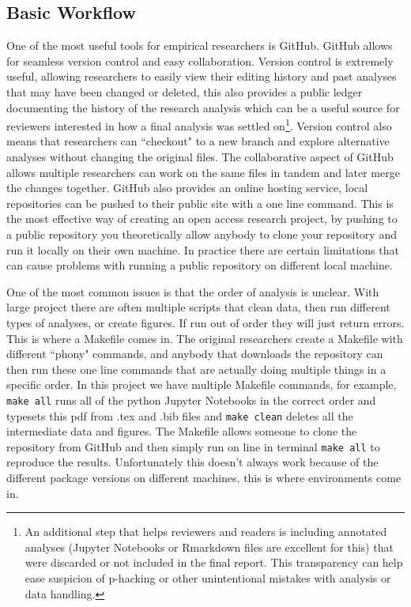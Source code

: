\documentclass[12pt]{article}
\newcommand{\inlinecode}{\texttt}
\begin{document}
\subsection{Basic Workflow}
One of the most useful tools for empirical researchers is GitHub. GitHub allows for seamless version control and easy collaboration. Version control is extremely useful, allowing researchers to easily view their editing history and past analyses that may have been changed or deleted, this also provides a public ledger documenting the history of the research analysis which can be a useful source for reviewers interested in how a final analysis was settled on\footnote{An additional step that helps reviewers and readers is including annotated analyses (Jupyter Notebooks or Rmarkdown files are excellent for this) that were discarded or not included in the final report. This transparency can help ease suspicion of p-hacking or other unintentional mistakes with analysis or data handling.}. Version control also means that researchers can ``checkout" to a new branch and explore alternative analyses without changing the original files. The collaborative aspect of GitHub allows multiple researchers can work on the same files in tandem and later merge the changes together. GitHub also provides an online hosting service, local repositories can be pushed to their public site with a one line command. This is the most effective way of creating an open access research project, by pushing to a public repository you theoretically allow anybody to clone your repository and run it locally on their own machine. In practice there are certain limitations that can cause problems with running a public repository on different local machine.

One of the most common issues is that the order of analysis is unclear. With large project there are often multiple scripts that clean data, then run different types of analyses, or create figures. If run out of order they will just return errors. This is where a Makefile comes in. The original researchers create a Makefile with different ``phony" commands, and anybody that downloads the repository can then run these one line commands that are actually doing multiple things in a specific order. In this project we have multiple Makefile commands, for example, \inlinecode{make all} runs all of the python Jupyter Notebooks in the correct order and typesets this pdf from .tex and .bib files and \inlinecode{make clean} deletes all the intermediate data and figures. The Makefile allows someone to clone the repository from GitHub and then simply run on line in terminal \inlinecode{make all} to reproduce the results. Unfortunately this doesn't always work because of the different package versions on different machines, this is where environments come in.
\end{document}
